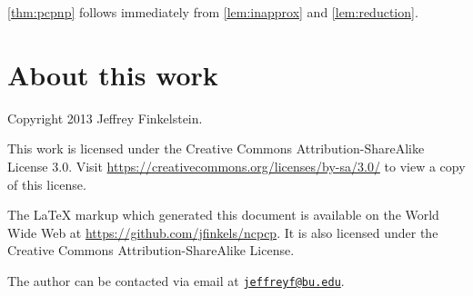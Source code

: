 \documentclass{article}
\newcommand{\email}[1]{\href{mailto:#1}{\nolinkurl{#1}}}
\begin{document}
\autoref{thm:pcpnp} follows immediately from \autoref{lem:inapprox} and \autoref{lem:reduction}.

\section{About this work}

Copyright 2013 Jef{}frey Finkelstein.

This work is licensed under the Creative Commons Attribution-ShareAlike License 3.0.
Visit \mbox{\url{https://creativecommons.org/licenses/by-sa/3.0/}} to view a copy of this license.

The \LaTeX{} markup which generated this document is available on the World Wide Web at \mbox{\url{https://github.com/jfinkels/ncpcp}}.
It is also licensed under the Creative Commons Attribution-ShareAlike License.

The author can be contacted via email at \email{jeffreyf@bu.edu}.



\end{document}
